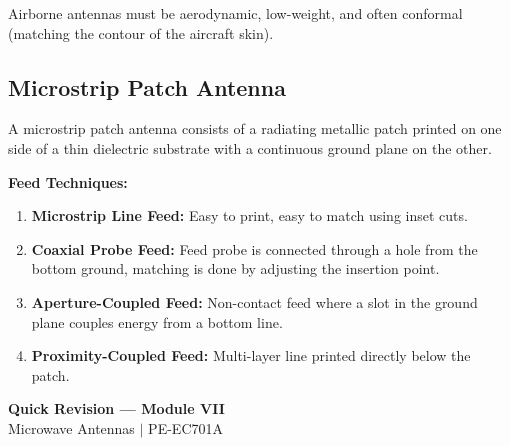 \documentclass[12pt,a4paper]{article}
\begin{document}
Airborne antennas must be aerodynamic, low-weight, and often conformal (matching the contour of the aircraft skin).

\subsection{Microstrip Patch Antenna}
A microstrip patch antenna consists of a radiating metallic patch printed on one side of a thin dielectric substrate with a continuous ground plane on the other.

\begin{tcolorbox}[tikzbox, title={Microstrip Patch Antenna Structure}]
\centering
{}
\end{tcolorbox}

\textbf{Feed Techniques:}
\begin{enumerate}[leftmargin=*, itemsep=3pt]
  \item \textbf{Microstrip Line Feed:} Easy to print, easy to match using inset cuts.
  \item \textbf{Coaxial Probe Feed:} Feed probe is connected through a hole from the bottom ground, matching is done by adjusting the insertion point.
  \item \textbf{Aperture-Coupled Feed:} Non-contact feed where a slot in the ground plane couples energy from a bottom line.
  \item \textbf{Proximity-Coupled Feed:} Multi-layer line printed directly below the patch.
\end{enumerate}

\newpage
\begin{center}
  {\large\bfseries\color{myred} Quick Revision --- Module VII}\\[3pt]
  {\small\color{mydark} Microwave Antennas $|$ PE-EC701A}
\end{center}
\noindent{\color{myred}\rule{\linewidth}{1.2pt}}
\vspace{4pt}
\end{document}
